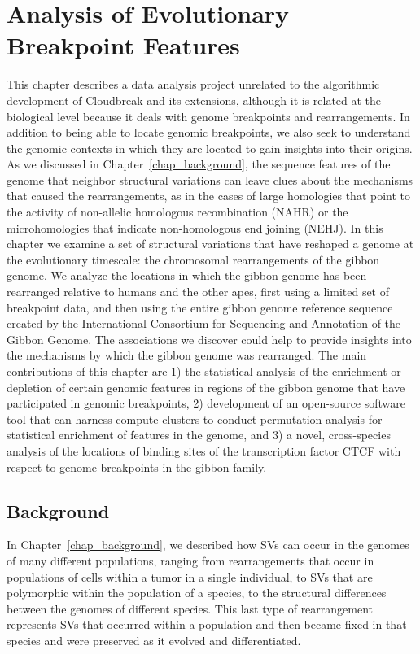 \chapter{Analysis of Evolutionary Breakpoint Features}
\label{chap_breakpoint_analysis}

This chapter describes a data analysis project unrelated to the algorithmic development of Cloudbreak and its extensions, although it is related at the biological level because it deals with genome breakpoints and rearrangements. In addition to being able to locate genomic breakpoints, we also seek to understand the genomic contexts in which they are located to gain insights into their origins. As we discussed in Chapter~\ref{chap_background}, the sequence features of the genome that neighbor structural variations can leave clues about the mechanisms that caused the rearrangements, as in the cases of large homologies that point to the activity of non-allelic homologous recombination (NAHR) or the microhomologies that indicate non-homologous end joining (NEHJ). In this chapter we examine a set of structural variations that have reshaped a genome at the evolutionary timescale: the chromosomal rearrangements of the gibbon genome. We analyze the locations in which the gibbon genome has been rearranged relative to humans and the other apes, first using a limited set of breakpoint data, and then using the entire gibbon genome reference sequence created by the International Consortium for Sequencing and Annotation of the Gibbon Genome. The associations we discover could help to provide insights into the mechanisms by which the gibbon genome was rearranged. The main contributions of this chapter are 1) the statistical analysis of the enrichment or depletion of certain genomic features in regions of the gibbon genome that have participated in genomic breakpoints, 2) development of an open-source software tool that can harness compute clusters to conduct permutation analysis for statistical enrichment of features in the genome, and 3) a novel, cross-species analysis of the locations of binding sites of the transcription factor CTCF with respect to genome breakpoints in the gibbon family.

\section{Background}

In Chapter~\ref{chap_background}, we described how SVs can occur in the genomes of many different populations, ranging from rearrangements that occur in populations of cells within a tumor in a single individual, to SVs that are polymorphic within the population of a species, to the structural differences between the genomes of different species. This last type of rearrangement represents SVs that occurred within a population and then became fixed in that species and were preserved as it evolved and differentiated. 

